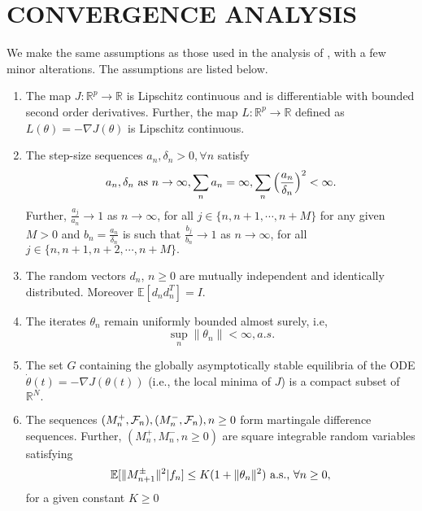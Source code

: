 \section{CONVERGENCE ANALYSIS}
\label{sec:convergenceresults}
We make the same assumptions as those used in the analysis of \cite{spall}, with a 
few minor alterations. The assumptions are listed below.

\begin{enumerate}[label= \textbf{A\arabic*}.]
 \item The map $J:\mathbb{R}^p \rightarrow \mathbb{R}$ is Lipschitz continuous and 
 is differentiable with bounded second order derivatives. Further, 
 the map $L:\mathbb{R}^p \rightarrow \mathbb{R}$ defined as 
 $L(\theta)=-\nabla J(\theta)$ is Lipschitz continuous.
 \item The step-size sequences $a_n, \delta_n >0, \forall n $  satisfy
 \begin{equation*}\label{stepsizes}
 a_n,\delta_n \text{ as } n \rightarrow \infty, \sum_na_n=\infty,
 \sum_n \Big{(}\frac{a_n}{\delta_n}\Big{)}^2<\infty.
 \end{equation*}
 Further, $\frac{a_j}{a_n}\rightarrow 1$ as $n\rightarrow \infty$, for all
 $j \in \{n,n+1,\cdots,n+M\}$ for any given $M>0$ and $b_n=\frac{a_n}{\delta_n}$ is 
 such that $\frac{b_j}{b_n}\rightarrow 1$ as $n\rightarrow \infty$, for all
 $j \in \{n,n+1,n+2,\cdots,n+M\}.$

 \item The random vectors $d_n$, $n\geq0$ are mutually independent and identically
 distributed. Moreover $\mathbb{E}[d_nd_n^T]=I.$
 
 \item The iterates $\theta_n$ remain uniformly bounded almost surely, i.e,
 $$ \sup_n\|\theta_n\|<\infty, a.s.$$

 \item The set $G$ containing the globally asymptotically stable equilibria of the 
 ODE $\dot{\theta}(t)=-\nabla J(\theta(t)) $ (i.e., the local minima of $J$)
 is a compact subset of $\mathbb{R}^N.$
 
 \item The sequences $(M_{n}^{+},\mathcal{F}_n),(M_{n}^{-},\mathcal{F}_n), n\geq0 $ form martingale difference sequences.
 Further, $(M_{n}^{+},M_{n}^{-},n\geq0)$ are square integrable random variables satisfying
 $$\mathbb{E}[\|M_{n+1}^{\pm}\|^2|f_n]\leq K(1+\|\theta_n\|^2) \text{ a.s., } \forall n\geq0,$$
 for a given constant $K \geq 0$
 
\end{enumerate}

